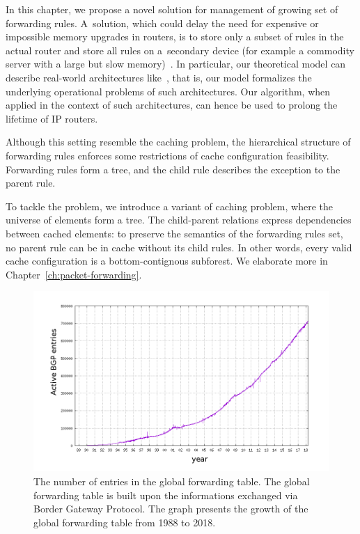 In this chapter, we propose a novel solution for management of growing set of forwarding rules.
A~solution, which could delay
the need for expensive or impossible memory upgrades in routers, is to store
only a subset of rules in the actual router and store all rules on a~secondary
device (for example a commodity server with a large but slow
memory)~\cite{cacheflow,route-caching-flat,prefix-caching,fib-caching-non-overlapping,fibium-zipf}.
In particular, our
theoretical model can describe real-world architectures
like~\cite{cacheflow,fibium-zipf},
that is, our model formalizes the underlying operational
problems of such architectures. Our 
algorithm, when applied in the context of such architectures, can 
hence be used to prolong the lifetime of IP routers.


Although this setting resemble the caching problem, the hierarchical structure of forwarding rules enforces some restrictions of cache configuration feasibility.
Forwarding rules form a tree, and the child rule describes the exception to the parent rule.

To tackle the problem, we introduce a variant of caching problem, where the universe of elements form a tree.
The child-parent relations express dependencies between cached elements: to preserve the semantics of the forwarding rules set, no parent rule can be in cache without its child rules.
In other words, every valid cache configuration is a bottom-contignous subforest.
We elaborate more in Chapter~\ref{ch:packet-forwarding}.


\begin{figure}[t]
\centering
\includegraphics[width=0.79\columnwidth]{figs/bgp-entries.png}
\caption{The number of entries in the global forwarding table. The global forwarding table is built upon the informations exchanged via Border Gateway Protocol. The graph presents the growth of the global forwarding table from 1988 to 2018.}\label{fig:bgp-entries}
\end{figure}


